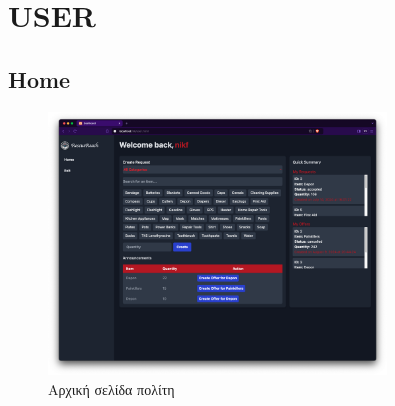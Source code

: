 \section{USER}
    \subsection{Home}
        \begin{figure}[H] \noindent \centering
            \includegraphics[width=0.8\textwidth]{img/user-dashboard}
            \caption{Αρχική σελίδα πολίτη}
        \end{figure}
